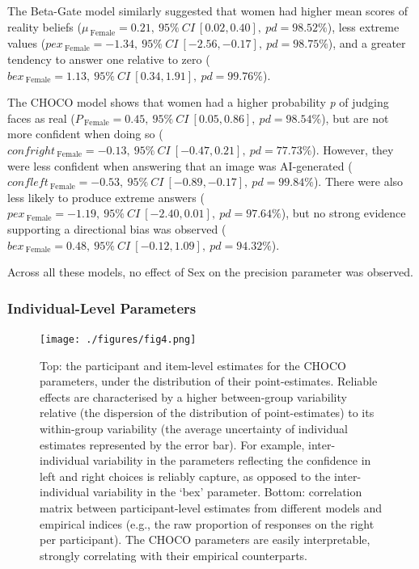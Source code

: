 \documentclass[
  jou,
  floatsintext,
  longtable,
  nolmodern,
  notxfonts,
  notimes,
  colorlinks=true,linkcolor=blue,citecolor=blue,urlcolor=blue]{apa7}
\begin{document}
The Beta-Gate model similarly suggested that women had higher mean
scores of reality beliefs
(\(\mu_{~\text{Female}} = 0.21,~95\%~ CI~[0.02, 0.40], ~pd = 98.52\%\)),
less extreme values
(\(pex_{~\text{Female}} = -1.34,~95\%~ CI~[-2.56, -0.17], ~pd = 98.75\%\)),
and a greater tendency to answer one relative to zero
(\(bex_{~\text{Female}} = 1.13,~95\%~ CI~[0.34, 1.91], ~pd = 99.76\%\)).

The CHOCO model shows that women had a higher probability \emph{p} of
judging faces as real
(\(P_{~\text{Female}} = 0.45,~95\%~ CI~[0.05, 0.86], ~pd = 98.54\%\)),
but are not more confident when doing so
(\(confright_{~\text{Female}} = -0.13,~95\%~ CI~[-0.47, 0.21], ~pd = 77.73\%\)).
However, they were less confident when answering that an image was
AI-generated
(\(confleft_{~\text{Female}} = -0.53,~95\%~ CI~[-0.89, -0.17], ~pd = 99.84\%\)).
There were also less likely to produce extreme answers
(\(pex_{~\text{Female}} = -1.19,~95\%~ CI~[-2.40, 0.01], ~pd = 97.64\%\)),
but no strong evidence supporting a directional bias was observed
(\(bex_{~\text{Female}} = 0.48,~95\%~ CI~[-0.12, 1.09], ~pd = 94.32\%\)).

Across all these models, no effect of Sex on the precision parameter was
observed.

\subsubsection{Individual-Level
Parameters}\label{individual-level-parameters}

\begin{figure}[!htbp]

{\caption{{Top: the participant and item-level estimates for the CHOCO
parameters, under the distribution of their point-estimates. Reliable
effects are characterised by a higher between-group variability relative
(the dispersion of the distribution of point-estimates) to its
within-group variability (the average uncertainty of individual
estimates represented by the error bar). For example, inter-individual
variability in the parameters reflecting the confidence in left and
right choices is reliably capture, as opposed to the inter-individual
variability in the `bex' parameter. Bottom: correlation matrix between
participant-level estimates from different models and empirical indices
(e.g., the raw proportion of responses on the right per participant).
The CHOCO parameters are easily interpretable, strongly correlating with
their empirical counterparts.}{\label{fig-four}}}}

\texttt{[image: ./figures/fig4.png]}

\end{figure}
\end{document}
